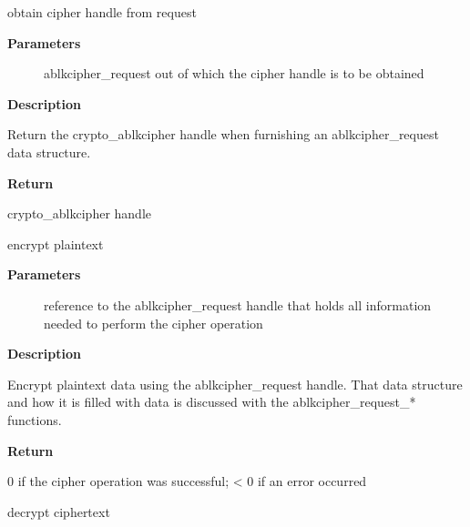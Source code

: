 \documentclass[a4paper,8pt,english]{sphinxmanual}
\begin{document}
\begin{fulllineitems}
\label{crypto/api-skcipher:c.crypto_ablkcipher_reqtfm}
obtain cipher handle from request

\end{fulllineitems}


\textbf{Parameters}
\begin{description}
\item[{}] \leavevmode
ablkcipher\_request out of which the cipher handle is to be obtained

\end{description}

\textbf{Description}

Return the crypto\_ablkcipher handle when furnishing an ablkcipher\_request
data structure.

\textbf{Return}

crypto\_ablkcipher handle

\begin{fulllineitems}
\label{crypto/api-skcipher:c.crypto_ablkcipher_encrypt}
encrypt plaintext

\end{fulllineitems}


\textbf{Parameters}
\begin{description}
\item[{}] \leavevmode
reference to the ablkcipher\_request handle that holds all information
needed to perform the cipher operation

\end{description}

\textbf{Description}

Encrypt plaintext data using the ablkcipher\_request handle. That data
structure and how it is filled with data is discussed with the
ablkcipher\_request\_* functions.

\textbf{Return}

0 if the cipher operation was successful; \textless{} 0 if an error occurred

\begin{fulllineitems}
\label{crypto/api-skcipher:c.crypto_ablkcipher_decrypt}
decrypt ciphertext

\end{fulllineitems}
\end{document}
